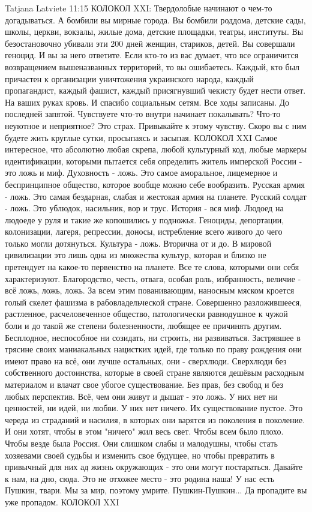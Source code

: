 Tatjana Latviete
11:15
КОЛОКОЛ XXI:
Твердолобые начинают о чем-то догадываться.
А бомбили вы мирные города. Вы бомбили роддома, детские сады, школы, церкви, вокзалы, жилые дома, детские площадки, театры, институты. Вы безостановочно убивали эти 200 дней женщин, стариков, детей.
Вы совершали геноцид.
И вы за него ответите. Если кто-то из вас думает, что все ограничится возвращением вышеназванных территорий, то вы ошибаетесь.
Каждый, кто был причастен к организации уничтожения украинского народа, каждый пропагандист, каждый фашист, каждый присягнувший чекисту будет нести ответ. На ваших руках кровь. И спасибо социальным сетям. Все ходы записаны. До последней запятой.
Чувствуете что-то внутри начинает покалывать? Что-то неуютное и неприятное? Это страх. Привыкайте к этому чувству. Скоро вы с ним будете жить круглые сутки, просыпаясь и засыпая.
КОЛОКОЛ XXI
Самое интересное, что абсолютно любая скрепа, любой культурный код, любые маркеры идентификации, которыми пытается себя определить житель имперской России - это ложь и миф.
Духовность - ложь. Это самое аморальное, лицемерное и беспринципное общество, которое вообще можно себе вообразить.
Русская армия - ложь. Это самая бездарная, слабая и жестокая армия на планете.
Русский солдат - ложь. Это ублюдок, насильник, вор и трус.
История - вся миф. Людоед на людоеде у руля и такие же копошились у подножья. Геноциды, депортации, колонизации, лагеря, репрессии, доносы, истребление всего живого до чего только могли дотянуться.
Культура - ложь. Вторична от и до. В мировой цивилизации это лишь одна из множества культур, которая и близко не претендует на какое-то первенство на планете.
Все те слова, которыми они себя характеризуют. Благородство, честь, отвага, особая роль, избранность, величие - всё ложь, ложь, ложь.
За всем этим пованивающим, наносным мяском кроется голый скелет фашизма в рабовладельческой стране.
Совершенно разложившееся, растленное, расчеловеченное общество, патологически равнодушное к чужой боли и до такой же степени болезненности, любящее ее причинять другим.
Бесплодное, неспособное ни созидать, ни строить, ни развиваться. Застрявшее в трясине своих маниакальных нацистких идей, где только по праву рождения они имеют право на всё, они лучше остальных, они - сверхлюди.
Сверхлюди без собственного достоинства, которые в своей стране являются дешёвым расходным материалом и влачат свое убогое существование. Без прав, без свобод и без любых перспектив.
Всё, чем они живут и дышат - это ложь.
У них нет ни ценностей, ни идей, ни любви.
У них нет ничего. Их существование пустое. Это череда из страданий и насилия, в которых они варятся из поколения в поколение. И они хотят, чтобы в этом "ничего" жил весь свет. Чтобы всем было плохо. Чтобы везде была Россия. Они слишком слабы и малодушны, чтобы стать хозяевами своей судьбы и изменить свое будущее, но чтобы превратить в привычный для них ад жизнь окружающих - это они могут постараться. Давайте к нам, на дно, сюда. Это не отхожее место - это родина наша!
У нас есть Пушкин, твари.
Мы за мир, поэтому умрите.
Пушкин-Пушкин...
Да пропадите вы уже пропадом.
КОЛОКОЛ XXI
